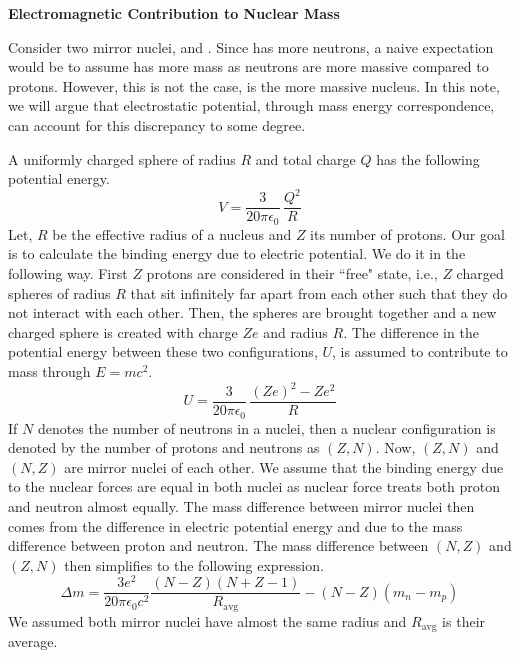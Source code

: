 \documentclass[a4paper, 12pt, oneside]{book}
\begin{document}
\begin{center}
	\Large \bfseries Electromagnetic Contribution to Nuclear Mass
	\hline
\end{center}

Consider two mirror nuclei,  and . Since  has more neutrons, a
naive expectation would be to assume  has more mass as neutrons are more massive compared
to protons. However, this is not the case,  is the more massive nucleus. In this note, we
will argue that electrostatic potential, through mass energy correspondence, can account for this
discrepancy to some degree.

A uniformly charged sphere of radius $R$ and total charge $Q$ has the following potential energy.
\begin{equation}
	V = \frac{3}{20 \pi \epsilon_0} \, \frac{Q^2}{R}
\end{equation}
Let, $R$ be the effective radius of a nucleus and $Z$ its number of protons. Our goal is to
calculate the binding energy due to electric potential. We do it in the following way. First $Z$
protons are considered in their ``free" state, i.e., $Z$ charged spheres of radius $R$ that sit
infinitely far apart from each other such that they do not interact with each other. Then, the
spheres are brought together and a new charged sphere is created with charge $Ze$ and radius $R$. The
difference in the potential energy between these two configurations, $U$, is assumed to contribute
to mass through $E=mc^2$.
\begin{equation}
	U = \frac{3}{20 \pi \epsilon_0} \, \frac{(Ze)^2 - Z e^2}{R}
\end{equation}
If $N$ denotes the number of neutrons in a nuclei, then a nuclear configuration is denoted by the
number of protons and neutrons as $(Z, N)$. Now, $(Z, N)$ and $(N, Z)$ are mirror nuclei of each
other. We assume that the binding energy due to the nuclear forces are equal in both nuclei as
nuclear force treats both proton and neutron almost equally. The mass difference between mirror
nuclei then comes from the difference in electric potential energy and due to the mass difference
between proton and neutron. The mass difference between $(N, Z)$ and $(Z, N)$ then simplifies to the
following expression.
\begin{equation}
	\Delta m = \frac{3e^2}{20 \pi \epsilon_0 c^2} \frac{(N-Z)(N+Z-1)}{R_\mathrm{avg}} - (N-Z) (m_n - m_p)
\end{equation}
We assumed both mirror nuclei have almost the same radius and $R_\mathrm{avg}$ is their average.
\end{document}
